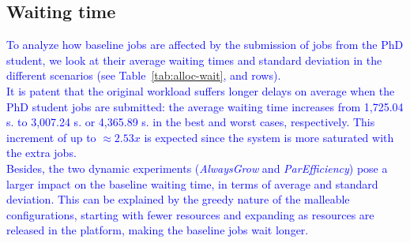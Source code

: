 \documentclass[a4paper,fleqn]{cas-dc}
\newcommand{\review}[1]{\textcolor{blue}{#1}}
\begin{document}
\subsection{Waiting time}\label{subsec:wt}
\review{
To analyze how baseline jobs are affected by the submission of jobs from the PhD student, we look at their average waiting times and standard deviation in the different scenarios (see Table~\ref{tab:alloc-wait}, \nth{6} and \nth{7} rows).
\\\indent
It is patent that the original workload suffers longer delays on average when the PhD student jobs are submitted: the average waiting time increases from 1,725.04 s. to 3,007.24 s. or 4,365.89 s. in the best and worst cases, respectively.
This increment of up to $\approx2.53x$ is expected since the system is more saturated with the extra jobs.
\\\indent
Besides, the two dynamic experiments (\textit{AlwaysGrow} and \textit{ParEfficiency}) pose a larger impact on the baseline waiting time, in terms of average and standard deviation.
This can be explained by the greedy nature of the malleable configurations, starting with fewer resources and expanding as resources are released in the platform, making the baseline jobs wait longer.
}

\end{document}
